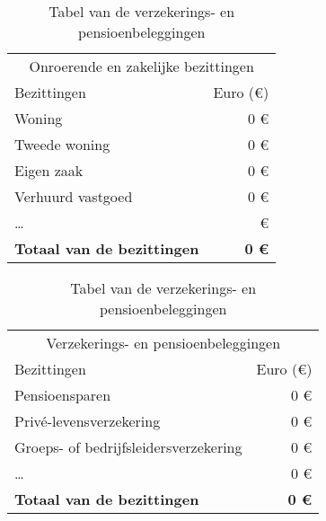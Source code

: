 \begin{table}[ht]
	\begin{minipage}[b]{9cm}\centering
		\begin{tabular}{@{}lr@{}}
			\toprule
			\multicolumn{2}{c}{Onroerende en zakelijke bezittingen}  \\
			\cmidrule(r){1-2}
			Bezittingen &        Euro (\euro{}) \\ \midrule
			Woning                           &             0 \euro{} \\
			Tweede woning                    &             0 \euro{} \\
			Eigen zaak                       &             0 \euro{} \\
			Verhuurd vastgoed                &             0 \euro{} \\
			\dots                            &               \euro{} \\ \toprule
			\textbf{Totaal van de bezittingen} & \textbf{0 \euro{}} \\ \bottomrule
		\end{tabular}
		\caption{Tabel van de onroerende en zakelijke bezittingen}
		\label{tab:tabelonroerendeenzakelijkebezittingen}
		
		
	\end{minipage}
	\hspace{0.5cm}
	\begin{minipage}[b]{9cm}\centering
		\begin{tabular}{@{}lr@{}}
			\toprule
			\multicolumn{2}{c}{Verzekerings- en pensioenbeleggingen}   \\
			\cmidrule(r){1-2}
			Bezittingen      &      Euro (\euro{}) \\ \midrule
			Pensioensparen                        &           0 \euro{} \\
			Privé-levensverzekering               &           0 \euro{} \\
			Groeps- of bedrijfsleidersverzekering &           0 \euro{} \\
			\dots                                 &          0 \euro{} \\ \toprule
			\textbf{Totaal van de bezittingen}    & \textbf{0 \euro{}} \\ \bottomrule
		\end{tabular}
		\caption{Tabel van de verzekerings- en pensioenbeleggingen}
		\label{tab:tabelverzekeringsenpensioenbeleggingen}
	\end{minipage}
\end{table}

